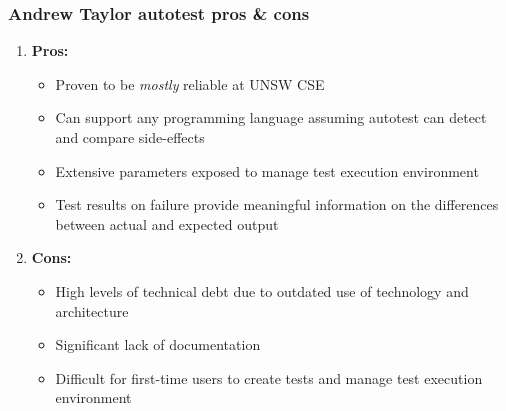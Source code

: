 \documentclass[xcolor]{beamer}
\begin{document}
\begin{frame}
	\frametitle{Andrew Taylor autotest pros \& cons}
	\begin{enumerate}
		\item \textbf{Pros:}
		\begin{itemize}
			\item Proven to be \textit{mostly} reliable at UNSW CSE
			\item Can support any programming language assuming autotest can detect and compare side-effects
			\item Extensive parameters exposed to manage test execution environment
			\item Test results on failure provide meaningful information on the differences between actual and expected output
		\end{itemize}
			\pause
		\item \textbf{Cons:}
		\begin{itemize}
			\item High levels of technical debt due to outdated use of technology and architecture
			\item Significant lack of documentation
			\item Difficult for first-time users to create tests and manage test execution environment
		\end{itemize}
	\end{enumerate}
\end{frame}
\end{document}

